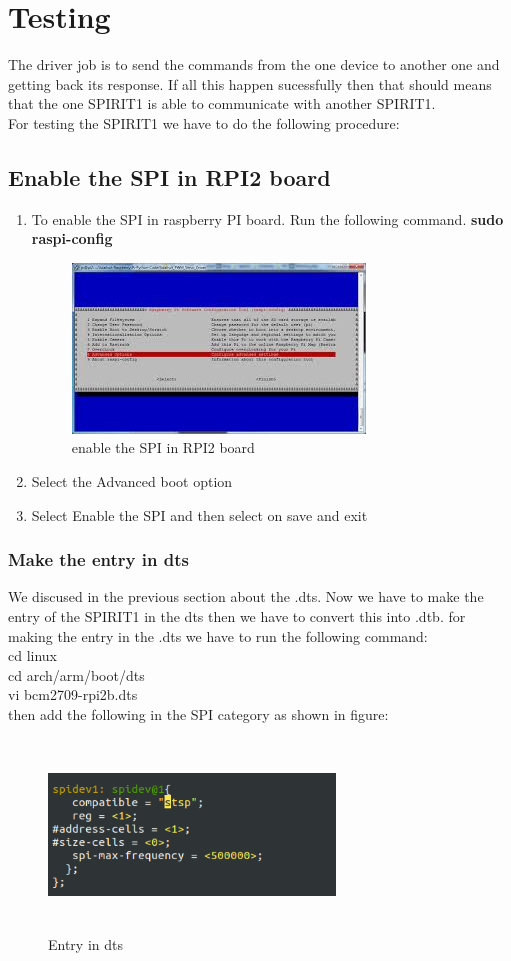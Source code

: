 \section{Testing}
The driver job is to send the commands from the one device to another one and getting back its response. If all this happen sucessfully then that should means that the one SPIRIT1 is able to communicate with another SPIRIT1.\\
For testing the SPIRIT1 we have to do the following procedure:
\subsection{Enable the SPI in RPI2 board}
	\begin{enumerate}
		\item To enable the SPI in raspberry PI board. Run the following command.
			\textbf{sudo raspi-config}
			\begin{figure}[ht]
				\centering
				\includegraphics[scale=1.3]{images/spi.png}
				\caption{enable the SPI in RPI2 board}
			\end{figure}
		\item Select the Advanced boot option
		\item Select Enable the SPI and then select on save and exit
	\end{enumerate}
\subsubsection{Make the entry in dts}
We discused in the previous section about the .dts. Now we have to make the entry of the SPIRIT1 in the dts then we have to convert this into .dtb. 
for making the entry in the .dts we have to run the following command:\\
cd linux\\
cd arch/arm/boot/dts\\
vi bcm2709-rpi2b.dts\\
then add the following in the SPI category as shown in figure:\\
\begin{figure}[H]
	\centering
	\includegraphics[width=3in, height=2in]{images/dts.png}
	\caption{Entry in dts}
\end{figure}
